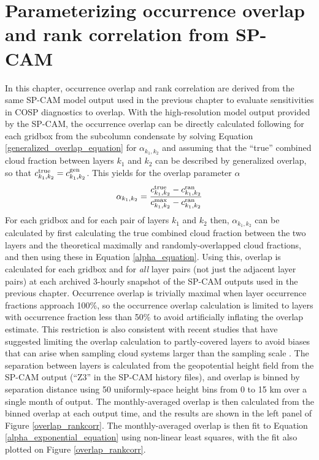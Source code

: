 \section{Parameterizing occurrence overlap and rank correlation from SP-CAM}
\label{subgrid2_overlap_section}
In this chapter, occurrence overlap and rank correlation are derived from the same SP-CAM model output used in the previous chapter to evaluate sensitivities in COSP diagnostics to overlap. With the high-resolution model output provided by the SP-CAM, the occurrence overlap can be directly calculated following \cite{pincus_et_al_2005} for each gridbox from the subcolumn condensate by solving Equation \ref{generalized_overlap_equation} for $\alpha_{k_1, k_2}$ and assuming that the ``true'' combined cloud fraction between layers $k_1$ and $k_2$ can be described by generalized overlap, so that $c^{\rm true}_{k_1, k_2} = c^{\rm gen}_{k_1, k_2}$. This yields for the overlap parameter $\alpha$
\begin{gather}
    \alpha_{k_1, k_2} = \frac{
        c^{\rm true}_{k_1, k_2} - c^{\rm ran}_{k_1, k_2}
    }{
        c^{\rm max}_{k_1, k_2} - c^{\rm ran}_{k_1, k_2}
    }
    \label{alpha_equation}
\end{gather}
For each gridbox and for each pair of layers $k_1$ and $k_2$ then, $\alpha_{k_1, k_2}$ can be calculated by first calculating the true combined cloud fraction between the two layers and the theoretical maximally and randomly-overlapped cloud fractions, and then using these in Equation \ref{alpha_equation}. Using this, overlap is calculated for each gridbox and for \emph{all} layer pairs (not just the adjacent layer pairs) at each archived 3-hourly snapshot of the SP-CAM outputs used in the previous chapter. Occurrence overlap is trivially maximal when layer occurrence fractions approach 100\%, so the occurrence overlap calculation is limited to layers with occurrence fraction less than 50\% to avoid artificially inflating the overlap estimate. This restriction is also consistent with recent studies that have suggested limiting the overlap calculation to partly-covered layers to avoid biases that can arise when sampling cloud systems larger than the sampling scale \citep[e.g.,][]{tompkins_and_digiuseppe_2015}. The separation between layers is calculated from the geopotential height field from the SP-CAM output (``Z3'' in the SP-CAM history files), and overlap is binned by separation distance using 50 uniformly-space height bins from 0 to 15 km over a single month of output. The monthly-averaged overlap is then calculated from the binned overlap at each output time, and the results are shown in the left panel of Figure \ref{overlap_rankcorr}. The monthly-averaged overlap is then fit to Equation \ref{alpha_exponential_equation} using non-linear least squares, with the fit also plotted on Figure \ref{overlap_rankcorr}. 

